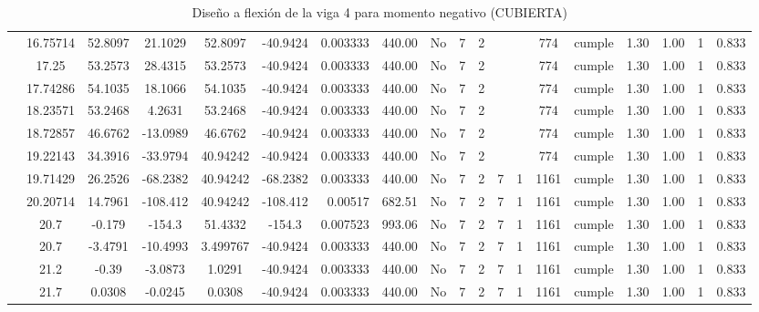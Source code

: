 \begin{table}[H]
{\begin{tabular}{|c|c|c|c|c|c|r|c|c|c|c|c|c|c|c|c|c|c|c|}
\cline{2-19}    & 16.75714 & 52.8097 & 21.1029 & 52.8097 & -40.9424 & 0.003333 & 440.00 & No  & 7   & 2   &     &     & 774 & \cellcolor[rgb]{ .776,  .937,  .808}cumple & 1.30 & 1.00 & 1   & 0.833 \bigstrut\\
\cline{2-19}    & 17.25 & 53.2573 & 28.4315 & 53.2573 & -40.9424 & 0.003333 & 440.00 & No  & 7   & 2   &     &     & 774 & \cellcolor[rgb]{ .776,  .937,  .808}cumple & 1.30 & 1.00 & 1   & 0.833 \bigstrut\\
\cline{2-19}    & 17.74286 & 54.1035 & 18.1066 & 54.1035 & -40.9424 & 0.003333 & 440.00 & No  & 7   & 2   &     &     & 774 & \cellcolor[rgb]{ .776,  .937,  .808}cumple & 1.30 & 1.00 & 1   & 0.833 \bigstrut\\
\cline{2-19}    & 18.23571 & 53.2468 & 4.2631 & 53.2468 & -40.9424 & 0.003333 & 440.00 & No  & 7   & 2   &     &     & 774 & \cellcolor[rgb]{ .776,  .937,  .808}cumple & 1.30 & 1.00 & 1   & 0.833 \bigstrut\\
\cline{2-19}    & 18.72857 & 46.6762 & -13.0989 & 46.6762 & -40.9424 & 0.003333 & 440.00 & No  & 7   & 2   &     &     & 774 & \cellcolor[rgb]{ .776,  .937,  .808}cumple & 1.30 & 1.00 & 1   & 0.833 \bigstrut\\
\cline{2-19}    & 19.22143 & 34.3916 & -33.9794 & 40.94242 & -40.9424 & 0.003333 & 440.00 & No  & 7   & 2   &     &     & 774 & \cellcolor[rgb]{ .776,  .937,  .808}cumple & 1.30 & 1.00 & 1   & 0.833 \bigstrut\\
\cline{2-19}    & 19.71429 & 26.2526 & -68.2382 & 40.94242 & -68.2382 & 0.003333 & 440.00 & No  & 7   & 2   & 7   & 1   & 1161 & \cellcolor[rgb]{ .776,  .937,  .808}cumple & 1.30 & 1.00 & 1   & 0.833 \bigstrut\\
\cline{2-19}    & 20.20714 & 14.7961 & -108.412 & 40.94242 & -108.412 & 0.00517 & 682.51 & No  & 7   & 2   & 7   & 1   & 1161 & \cellcolor[rgb]{ .776,  .937,  .808}cumple & 1.30 & 1.00 & 1   & 0.833 \bigstrut\\
\cline{2-19}    & 20.7 & -0.179 & -154.3 & 51.4332 & -154.3 & 0.007523 & 993.06 & No  & 7   & 2   & 7   & 1   & 1161 & \cellcolor[rgb]{ .776,  .937,  .808}cumple & 1.30 & 1.00 & 1   & 0.833 \bigstrut\\
\cline{2-19}    & 20.7 & -3.4791 & -10.4993 & 3.499767 & -40.9424 & 0.003333 & 440.00 & No  & 7   & 2   & 7   & 1   & 1161 & \cellcolor[rgb]{ .776,  .937,  .808}cumple & 1.30 & 1.00 & 1   & 0.833 \bigstrut\\
\cline{2-19}    & 21.2 & -0.39 & -3.0873 & 1.0291 & -40.9424 & 0.003333 & 440.00 & No  & 7   & 2   & 7   & 1   & 1161 & \cellcolor[rgb]{ .776,  .937,  .808}cumple & 1.30 & 1.00 & 1   & 0.833 \bigstrut\\
\cline{2-19}    & 21.7 & 0.0308 & -0.0245 & 0.0308 & -40.9424 & 0.003333 & 440.00 & No  & 7   & 2   & 7   & 1   & 1161 & \cellcolor[rgb]{ .776,  .937,  .808}cumple & 1.30 & 1.00 & 1   & 0.833 \bigstrut\\
\hline
\end{tabular}%

  }
      \caption{Diseño a flexión de la viga 4 para momento negativo (CUBIERTA) }
  \label{tab:F VG4 CUB M-}%
\end{table}%
